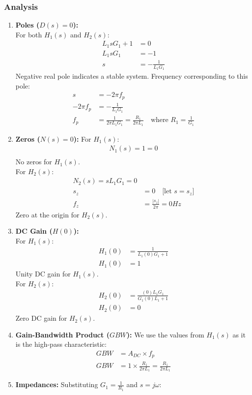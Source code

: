 \subsubsection{Analysis}
\begin{enumerate}
    \item \textbf{Poles (\(D(s) = 0\)):} \\
      For both \(H_1(s)\) and \(H_2(s)\):
      \begin{align*}
        L_1 s G_1 + 1 &= 0 \\
        L_1 s G_1 &= -1 \\
        s &= -\frac{1}{L_1 G_1}
      \end{align*}
      Negative real pole indicates a stable system. Frequency
      corresponding to this pole:
      \begin{align*}
        s &= -2 \pi f_p \\
        -2 \pi f_p &= -\frac{1}{L_1 G_1} \\
        f_p &= \frac{1}{2 \pi L_1 G_1} = \frac{R_1}{2 \pi L_1} \quad\text{where } R_1 = \frac{1}{G_1}
      \end{align*}
    \item \textbf{Zeros (\(N(s) = 0\)):}
      For \(H_1(s)\):
      \begin{align*}
          N_1(s) = 1 = 0 \\
      \end{align*}
      No zeros for \(H_1(s)\). \\
      For \(H_2(s)\):
      \begin{align*}
          N_2(s) = s L_1 G_1 = 0 \\
          s_z &= 0 \quad \text{[let \(s = s_z\)]} \\
          f_z &= \frac{|s_z|}{2\pi} = 0 Hz
      \end{align*}
      Zero at the origin for \(H_2(s)\).
    \item \textbf{DC Gain (\(H(0)\)):} \\
      For \(H_1(s)\):
      \begin{align*}
        H_1(0) &= \frac{1}{L_1 (0) G_1 + 1} \\
        H_1(0) &= 1
      \end{align*}
      Unity DC gain for \(H_1(s)\). \\
      For \(H_2(s)\):
      \begin{align*}
        H_2(0) &= \frac{(0) L_1 G_1}{G_1 (0) L_1 + 1} \\
        H_2(0) &= 0
      \end{align*}
      Zero DC gain for \(H_2(s)\).
    \item \textbf{Gain-Bandwidth Product (\(GBW\)):}
      We use the values from \(H_1(s)\) as it is the
      high-pass characteristic:
      \begin{align*}
        GBW &= A_{DC} \times f_p \\
        GBW &= 1 \times \frac{R_1}{2 \pi L_1} = \frac{R_1}{2 \pi L_1}
      \end{align*}
    \item \textbf{Impedances:}
      Substituting \(G_1 = \frac{1}{R_1}\) and \(s = j \omega\):

\end{enumerate}
